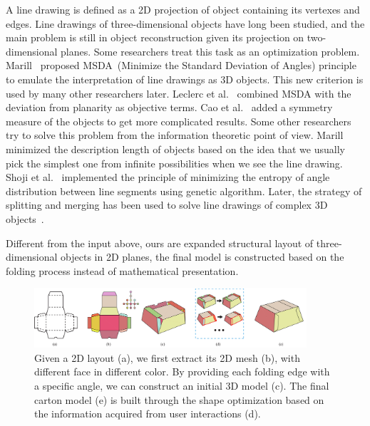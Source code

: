 A line drawing is defined as a 2D projection of object containing its vertexes and edges. Line drawings of three-dimensional objects have long been studied, and the main problem is still in object reconstruction given its projection on two-dimensional planes. 
Some researchers treat this task as an optimization problem. 
Marill~\cite{Marill:1991:EHI:113057.113061} proposed MSDA~(Minimize the Standard Deviation of Angles) principle to emulate the interpretation of line drawings as 3D objects. 
This new criterion is used by many other researchers later. 
Leclerc et al.~\cite{Leclerc1992An} combined MSDA with the deviation from planarity as objective terms. 
Cao et al.~\cite{Cao:2005:ORS:1097114.1097658} added a symmetry measure of the objects to get more complicated results. 
Some other researchers try to solve this problem from the information theoretic point of view. 
Marill~\cite{Marill1992Why} minimized the description length of objects based on the idea that we usually pick the simplest one from infinite possibilities when we see the line drawing. 
Shoji et al.~\cite{Shoji20013} implemented the principle of minimizing the entropy of angle distribution between line segments using genetic algorithm. Later, the strategy of splitting and merging has been used to solve line drawings of complex 3D objects~\cite{10.1109/TPAMI.2010.49,10.1109/CVPR.2014.94}.   
		 
Different from the input above, ours are expanded structural layout of three-dimensional objects in 2D planes, the final model is constructed based on the folding process instead of mathematical presentation.

\begin{figure}
	\centering
	\includegraphics[width=0.9\textwidth]{images/overview}
	\caption{Given a 2D layout (a), we first extract its 2D mesh (b), with different face in different color. By providing each folding edge with a specific angle, we can construct an initial 3D model (c). The final carton model (e) is built through the shape optimization based on the information acquired from user interactions (d).}
	\label{fig:overview}
\end{figure} 

